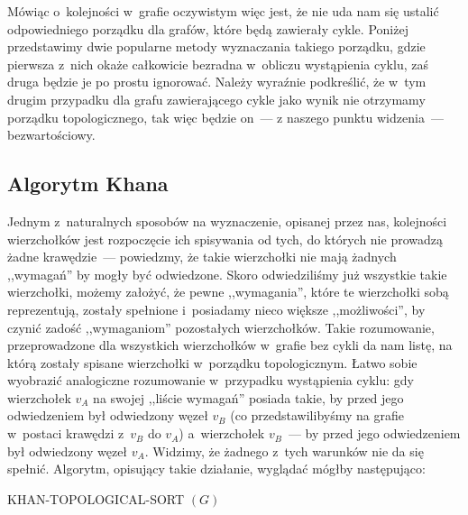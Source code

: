 Mówiąc o~kolejności w~grafie oczywistym więc jest, że nie uda nam się ustalić odpowiedniego porządku dla grafów, które będą zawierały cykle. Poniżej przedstawimy dwie popularne metody wyznaczania takiego porządku, gdzie pierwsza z~nich okaże całkowicie bezradna w~obliczu wystąpienia cyklu, zaś druga będzie je po prostu ignorować. Należy wyraźnie podkreślić, że w~tym drugim przypadku dla grafu zawierającego cykle jako wynik nie otrzymamy porządku topologicznego, tak więc będzie on~--- z naszego punktu widzenia~--- bezwartościowy.

\subsection{Algorytm Khana}

Jednym z~naturalnych sposobów na wyznaczenie, opisanej przez nas, kolejności wierzchołków jest rozpoczęcie ich spisywania od tych, do których nie prowadzą żadne krawędzie~--- powiedzmy, że takie wierzchołki nie mają żadnych ,,wymagań'' by mogły być odwiedzone. Skoro odwiedziliśmy już wszystkie takie wierzchołki, możemy założyć, że pewne ,,wymagania'', które te wierzchołki sobą reprezentują, zostały spełnione i~posiadamy nieco większe ,,możliwości'', by czynić zadość ,,wymaganiom'' pozostałych wierzchołków. Takie rozumowanie, przeprowadzone dla wszystkich wierzchołków w~grafie bez cykli da nam listę, na którą zostały spisane wierzchołki w~porządku topologicznym. Łatwo sobie wyobrazić analogiczne rozumowanie w~przypadku wystąpienia cyklu: gdy wierzchołek $v_{A}$ na swojej ,,liście wymagań'' posiada takie, by przed jego odwiedzeniem był odwiedzony węzeł $v_{B}$ (co przedstawilibyśmy na grafie w~postaci krawędzi z~$v_{B}$ do $v_{A}$) a~wierzchołek $v_{B}$~--- by przed jego odwiedzeniem był odwiedzony węzeł $v_{A}$. Widzimy, że żadnego z~tych warunków nie da się spełnić. Algorytm, opisujący takie działanie, wyglądać mógłby następująco:

\begin{pseudokod}[!htbp]
\DontPrintSemicolon
{}
\caption{ KHAN-TOPOLOGICAL-SORT $\left( G \right)$\label{alg:KhanTopologicalSort}}
\end{pseudokod}


